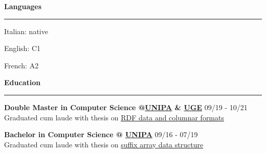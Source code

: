 \documentclass[10pt,letterpaper]{article}
\begin{document}
\begin{justify}
\begin{minipage}[t]{7.5cm}
\begin{itemize}[label={}, leftmargin=0pt]
\begin{item}
                  \end{item}
            \end{itemize}
      \end{minipage}
      \hfill
      \begin{minipage}[t]{2.5cm}
            \textbf{Languages}\strut
            \hrule
            \vspace{0.2cm}
            \begin{itemize}[label={}, leftmargin=0pt]
                  \begin{item}
                        Italian: native
                  \end{item}
                  \begin{item}
                        English: C1
                  \end{item}
                  \begin{item}
                        French: A2
                  \end{item}
            \end{itemize}
      \end{minipage}

      \vspace{0.15cm}
      {\Large \textbf{Education} \strut}
      \hrule
      \begin{itemize}[label={}, leftmargin=0pt]
            \begin{item}
                  \textbf{Double Master in Computer Science @\href{https://www.unipa.it/mobilita/en/}{UNIPA} \& \href{https://www.univ-gustave-eiffel.fr/en/}{UGE}}
                  \hfill
                  \small{09/19 - 10/21}
                  \\
                  Graduated cum laude with thesis on
                  \href{https://raw.githubusercontent.com/dariocurr/thesis/main/thesis.pdf}{RDF data and columnar formats}
            \end{item}
            \begin{item}
                  \textbf{Bachelor in Computer Science @ \href{https://www.unipa.it/mobilita/en/}{UNIPA}}
                  \hfill
                  \small{09/16 - 07/19}
                  \\
                  Graduated cum laude with thesis on
                  \href{https://dariocurr.github.io/assets/img/poster.png}{suffix array data structure}
            \end{item}
      \end{itemize}


\end{justify}
\end{document}
